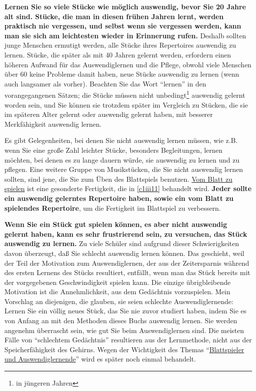 \textbf{Lernen Sie so viele Stücke wie möglich auswendig, bevor Sie 20 Jahre alt sind.
Stücke, die man in diesen frühen Jahren lernt, werden praktisch nie vergessen, und selbst wenn sie vergessen werden, kann man sie sich am leichtesten wieder in Erinnerung rufen.}
Deshalb sollten junge Menschen ermutigt werden, alle Stücke ihres Repertoires auswendig zu lernen.
Stücke, die später als mit 40 Jahren gelernt werden, erfordern einen höheren Aufwand für das Auswendiglernen und die Pflege, obwohl viele Menschen über 60 keine Probleme damit haben, neue Stücke auswendig zu lernen (wenn auch langsamer als vorher).
Beachten Sie das Wort \enquote{lernen} in den vorangegangenen Sätzen; die Stücke müssen nicht unbedingt\footnote{in jüngeren Jahren} auswendig gelernt worden sein, und Sie können sie trotzdem später im Vergleich zu Stücken, die sie im späteren Alter gelernt oder auswendig gelernt haben, mit besserer Merkfähigkeit auswendig lernen.

Es gibt Gelegenheiten, bei denen Sie nicht auswendig lernen müssen, wie z.B. wenn Sie eine große Zahl leichter Stücke, besonders Begleitungen, lernen möchten, bei denen es zu lange dauern würde, sie auswendig zu lernen und zu pflegen.
Eine weitere Gruppe von Musikstücken, die Sie nicht auswendig lernen sollten, sind jene, die Sie zum Üben des Blattspiels benutzen.
\hyperref[c1iii11]{Vom Blatt zu spielen} ist eine gesonderte Fertigkeit, die in \ref*{c1iii11} behandelt wird.
\textbf{Jeder sollte ein auswendig gelerntes Repertoire haben, sowie ein vom Blatt zu spielendes Repertoire}, um die Fertigkeit im Blattspiel zu verbessern.

\textbf{Wenn Sie ein Stück gut spielen können, es aber nicht auswendig gelernt haben, kann es sehr frustrierend sein, zu versuchen, das Stück auswendig zu lernen.}
Zu viele Schüler sind aufgrund dieser Schwierigkeiten davon überzeugt, daß Sie schlecht auswendig lernen können.
Das geschieht, weil der Teil der Motivation zum Auswendiglernen, der aus der Zeitersparnis während des ersten Lernens des Stücks resultiert, entfällt, wenn man das Stück bereits mit der vorgegebenen Geschwindigkeit spielen kann.
Die einzige übrigbleibende Motivation ist die Annehmlichkeit, aus dem Gedächtnis vorzuspielen.
Mein Vorschlag an diejenigen, die glauben, sie seien schlechte Auswendiglernende: Lernen Sie ein völlig neues Stück, das Sie nie zuvor studiert haben, indem Sie es von Anfang an mit den Methoden dieses Buchs auswendig lernen.
Sie werden angenehm überrascht sein, wie gut Sie beim Auswendiglernen sind.
Die meisten Fälle von \enquote{schlechtem Gedächtnis} resultieren aus der Lernmethode, nicht aus der Speicherfähigkeit des Gehirns.
Wegen der Wichtigkeit des Themas \enquote{\hyperref[c1iii6l]{Blattspieler und Auswendiglernende}} wird es später noch einmal behandelt.
 


